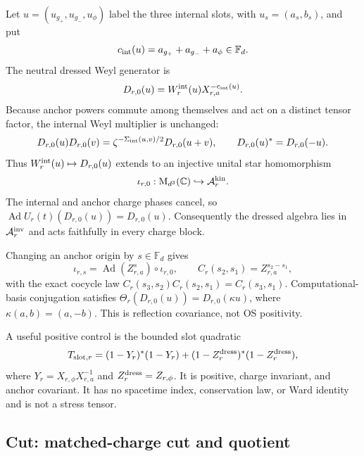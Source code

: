 \documentclass[11pt,a4paper]{article}
\theoremstyle{definition}
\theoremstyle{remark}
\newcommand{\C}{\mathbb C}
\newcommand{\Fd}{\mathbb F_d}
\newcommand{\A}{\mathcal A}
\newcommand{\M}{\mathrm M}
\newcommand{\Ad}{\operatorname{Ad}}
\begin{document}
Let $u=(u_{g_+},u_{g_-},u_\phi)$ label the three internal slots, with
$u_s=(a_s,b_s)$, and put
\begin{equation}
 c_{\rm int}(u)=a_{g_+}+a_{g_-}+a_\phi\in\Fd.
\end{equation}
The neutral dressed Weyl generator is
\begin{equation}
 D_{r,0}(u)=W_r^{\rm int}(u)X_{r,a}^{-c_{\rm int}(u)}.
 \label{eq:dressing}
\end{equation}
Because anchor powers commute among themselves and act on a distinct tensor factor,
the internal Weyl multiplier is unchanged:
\begin{equation}
 D_{r,0}(u)D_{r,0}(v)
 =\zeta^{-\Sigma_{\rm int}(u,v)/2}D_{r,0}(u+v),
 \qquad D_{r,0}(u)^*=D_{r,0}(-u).
 \label{eq:dressed-weyl}
\end{equation}
Thus $W_r^{\rm int}(u)\mapsto D_{r,0}(u)$ extends to an injective unital star
homomorphism
\begin{equation}
 \iota_{r,0}:\M_{d^3}(\C)\hookrightarrow\A_r^{\rm kin}.
\end{equation}
The internal and anchor charge phases cancel, so
$\Ad U_r(t)(D_{r,0}(u))=D_{r,0}(u)$.  Consequently the dressed algebra lies in
$\A_r^{\rm inv}$ and acts faithfully in every charge block.

Changing an anchor origin by $s\in\Fd$ gives
\begin{equation}
 \iota_{r,s}=\Ad(Z_{r,a}^s)\circ\iota_{r,0},\qquad
 C_r(s_2,s_1)=Z_{r,a}^{s_2-s_1},
 \label{eq:anchor-cocycle}
\end{equation}
with the exact cocycle law
$C_r(s_3,s_2)C_r(s_2,s_1)=C_r(s_3,s_1)$.  Computational-basis conjugation satisfies
$\Theta_r(D_{r,0}(u))=D_{r,0}(\kappa u)$, where $\kappa(a,b)=(a,-b)$.  This is
reflection covariance, not OS positivity.

A useful positive control is the bounded slot quadratic
\begin{equation}
 T_{{\rm slot},r}=(1-Y_r)^*(1-Y_r)+(1-Z_r^{\rm dress})^*(1-Z_r^{\rm dress}),
 \label{eq:tslot}
\end{equation}
where $Y_r=X_{r,\phi}X_{r,a}^{-1}$ and $Z_r^{\rm dress}=Z_{r,\phi}$.  It is positive,
charge invariant, and anchor covariant.  It has no spacetime index, conservation law,
or Ward identity and is not a stress tensor.

\subsection{Cut: matched-charge cut and quotient}
\end{document}
